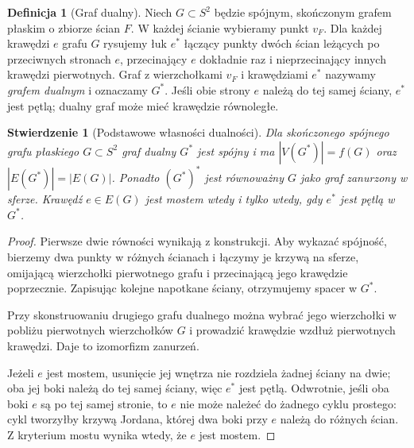 \documentclass[11pt,a4paper]{report}
\numberwithin{equation}{section}
\theoremstyle{plain}
\newtheorem{stwierdzenie}[twierdzenie]{Stwierdzenie}
\theoremstyle{definition}
\newtheorem{definicja}[twierdzenie]{Definicja}
\theoremstyle{remark}
\begin{document}
\begin{definicja}[Graf dualny]
Niech $G\subset S^2$ będzie spójnym, skończonym grafem
płaskim o zbiorze ścian $F$. W każdej ścianie wybieramy
punkt $v_F$. Dla każdej krawędzi $e$ grafu $G$ rysujemy
łuk $e^*$ łączący punkty dwóch ścian leżących po
przeciwnych stronach $e$, przecinający $e$ dokładnie
raz i nieprzecinający innych krawędzi pierwotnych.
Graf z wierzchołkami $v_F$ i krawędziami $e^*$
nazywamy \emph{grafem dualnym} i oznaczamy $G^*$.
Jeśli obie strony $e$ należą do tej samej ściany,
$e^*$ jest pętlą; dualny graf może mieć krawędzie równoległe.
\end{definicja}

\begin{stwierdzenie}[Podstawowe własności dualności]
\label{thm:tg-dual-basic}
Dla skończonego spójnego grafu płaskiego $G\subset S^2$
graf dualny $G^*$ jest spójny i ma
$|V(G^*)|=f(G)$ oraz $|E(G^*)|=|E(G)|$.
Ponadto $(G^*)^*$ jest równoważny $G$ jako graf zanurzony
w sferze. Krawędź $e\in E(G)$ jest mostem wtedy i tylko
wtedy, gdy $e^*$ jest pętlą w $G^*$.
\end{stwierdzenie}

\begin{proof}
Pierwsze dwie równości wynikają z konstrukcji.
Aby wykazać spójność, bierzemy dwa punkty w różnych
ścianach i łączymy je krzywą na sferze, omijającą
wierzchołki pierwotnego grafu i przecinającą jego
krawędzie poprzecznie. Zapisując kolejne napotkane
ściany, otrzymujemy spacer w $G^*$.

Przy skonstruowaniu drugiego grafu dualnego można
wybrać jego wierzchołki w pobliżu pierwotnych
wierzchołków $G$ i prowadzić krawędzie wzdłuż
pierwotnych krawędzi. Daje to izomorfizm zanurzeń.

Jeżeli $e$ jest mostem, usunięcie jej wnętrza nie
rozdziela żadnej ściany na dwie; oba jej boki należą
do tej samej ściany, więc $e^*$ jest pętlą.
Odwrotnie, jeśli oba boki $e$ są po tej samej stronie,
to $e$ nie może należeć do żadnego cyklu prostego:
cykl tworzyłby krzywą Jordana, której dwa boki
przy $e$ należą do różnych ścian. Z kryterium mostu
wynika wtedy, że $e$ jest mostem.
\end{proof}
\end{document}
